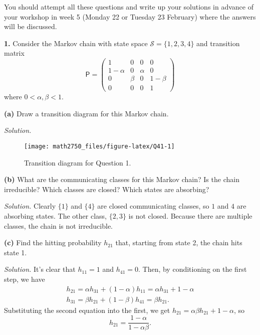 \documentclass[
  a4paper,
]{article}
\theoremstyle{definition}
\theoremstyle{definition}
\theoremstyle{definition}
\theoremstyle{remark}
\begin{document}
You should attempt all these questions and write up your solutions in advance of your workshop in week 5 (Monday 22 or Tuesday 23 February) where the answers will be discussed.

\textbf{1.} Consider the Markov chain with state space \(\mathcal S = \{1,2,3,4\}\) and transition matrix
\[ \mathsf P = \begin{pmatrix} 1 & 0 & 0 & 0 \\
1-\alpha & 0 & \alpha & 0 \\
0 & \beta & 0 & 1-\beta \\
0 & 0 & 0 & 1 \end{pmatrix}   \]
where \(0 < \alpha, \beta < 1\).

\textbf{(a)} Draw a transition diagram for this Markov chain.

\begin{myanswers}

\emph{Solution.}

\begin{figure}

{\centering \texttt{[image: math2750\_files/figure-latex/Q41-1]} 

}

\caption{Transition diagram for Question 1.}\label{fig:Q41}
\end{figure}

\end{myanswers}

\textbf{(b)} What are the communicating classes for this Markov chain? Is the chain irreducible? Which classes are closed? Which states are absorbing?

\begin{myanswers}

\emph{Solution.} Clearly \(\{1\}\) and \(\{4\}\) are closed communicating classes, so \(1\) and \(4\) are absorbing states. The other class, \(\{2,3\}\) is not closed. Because there are multiple classes, the chain is not irreducible.

\end{myanswers}

\textbf{(c)} Find the hitting probability \(h_{21}\) that, starting from state 2, the chain hits state 1.

\begin{myanswers}

\emph{Solution.} It's clear that \(h_{11} = 1\) and \(h_{41} = 0\). Then, by conditioning on the first step, we have
\begin{gather*}
    h_{21} = \alpha h_{31} + (1-\alpha) h_{11} = \alpha h_{31} + 1 - \alpha \\
    h_{31} = \beta h_{21} + (1-\beta) h_{41} = \beta h_{21} .
    \end{gather*}
Substituting the second equation into the first, we get \(h_{21} = \alpha\beta h_{21} + 1 - \alpha\), so
\[ h_{21} = \frac{1-\alpha}{1-\alpha\beta}  . \]

\end{myanswers}
\end{document}
